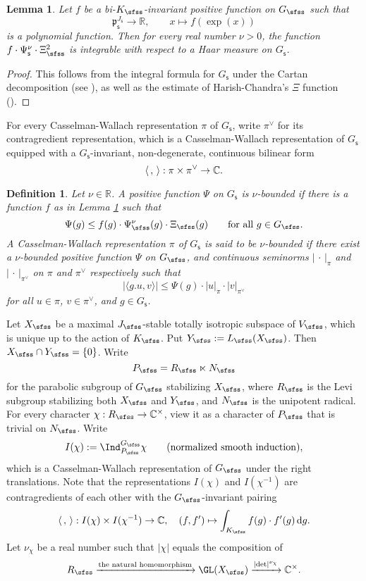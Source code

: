 \documentclass[12pt,a4paper]{amsart}
\def\abs#1{\left|{#1}\right|}
\newcommand{\od}{\operatorname{d}}
\newcommand{\p}{\mathfrak p}
\newcommand{\R}{\mathbb R}
\newcommand{\la}{\langle}
\newcommand{\ra}{\rangle}
\newcommand{\be}{\begin {equation}}
\newcommand{\ee}{\end {equation}}
\numberwithin{equation}{section}
\newtheorem{lem}[thm]{Lemma}
\newtheorem{defn}[thm]{Definition}
\theoremstyle{remark}
\begin{document}
\begin{lem}\label{int}
Let $f$ be a bi-$K_\sfss$-invariant positive function  on $G_\sfss$  such that
\[
  \p_\mathsf s^{J_\mathsf s}\rightarrow \R, \qquad x\mapsto f(\exp(x))  
\]
is a polynomial function. Then for every real number $\nu>0$, the function $f\cdot \Psi_\mathsf s^\nu\cdot \Xi_\sfss^2$ is integrable with respect to a Haar measure on $G_\mathsf s$.  
\end{lem}
\begin{proof}
  This follows from the integral formula for $G_\mathsf s$ under the Cartan decomposition (see 
 \cite[Lemma 2.4.2]{Wa1}), as well as the  estimate of Harish-Chandra's $\Xi$ function (\cite[Theorem 4.5.3]{Wa1}).
\end{proof}

For every Casselman-Wallach representation $\pi$ of $G_\mathsf s$, write $\pi^\vee$ for its contragredient representation, which is a  Casselman-Wallach representation  of $G_\mathsf s$ equipped with a $G_{\mathsf s}$-invariant, non-degenerate, continuous bilinear form
 \[
   \la\,,\,\ra: \pi \times\pi^\vee\rightarrow \C.
 \]

\begin{defn}
Let $\nu\in \R$. A  positive function $\Psi$ on $G_\mathsf s$ is $\nu$-bounded if there is a  function $f$ as in Lemma \ref{int}  such that
\[
  \Psi(g)\leq f(g)\cdot \Psi_{\sfss}^\nu(g)\cdot \Xi_\sfss(g)\qquad \textrm{for all }g\in G_\sfss. 
\]
A Casselman-Wallach representation $\pi$ of $G_\mathsf s$ is said to be $\nu$-bounded if there
exist a $\nu$-bounded positive function $\Psi$ on $G_\sfss$, and continuous seminorms $\abs{\,\cdot\,}_{\pi}$ and $\abs{\,\cdot\,}_{\pi^\vee}$ on  $ \pi$ and $\pi^\vee$ respectively such that 
\[
 \abs{ \la g. u, v\ra}\leq \Psi(g)\cdot \abs{u}_{\pi}\cdot \abs{v}_{\pi^\vee}
\]
for all $u\in \pi$, $v\in \pi^\vee$, and $g\in G_{\mathsf s}$. 

\end{defn}

Let $X_\sfss$ be a maximal $J_\sfss$-stable totally isotropic subspace of $V_\sfss$, which is unique  up to the action of $K_\sfss$. Put $Y_\sfss:=L_\sfss(X_\sfss)$. Then $X_\sfss\cap Y_\sfss=\{0\}$.
Write 
\[
P_\sfss=R_\sfss\ltimes N_\sfss
\]
 for the parabolic subgroup of $G_\sfss$ stabilizing $X_\sfss$, where $R_\sfss$ is the Levi subgroup stabilizing both $X_\sfss$ and $Y_\sfss$, and $N_\sfss$ is the unipotent radical. For every character $\chi: R_\sfss\rightarrow \C^\times$, view it as a character of $P_\sfss$ that is trivial on $N_\sfss$. Write
\[
  I(\chi):=\Ind_{P_\sfss}^{G_\sfss}\chi \qquad(\textrm{normalized smooth induction}),
\]
which is a Casselman-Wallach representation of $G_\sfss$ under the right translations. Note that the representations   $I(\chi)$ and $ I(\chi^{-1})$ are contragredients of each other with the $G_\sfss$-invariant pairing
 \[
  \la\,,\,\ra:  I(\chi)\times I(\chi^{-1})\rightarrow \C, \quad (f, f')\mapsto \int_{K_\sfss} f(g) \cdot f'(g) \od\!g.
 \]
Let $\nu_\chi$ be a real number such that $\abs{\chi}$ equals the composition of
\be\label{nuchi}
   R_\sfss\xrightarrow{\textrm{the natural homomorphism} }\GL(X_\sfss)\xrightarrow{\abs{\det}^{\nu_\chi}} \C^\times.
\ee
\end{document}
